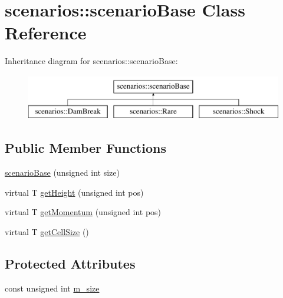 \hypertarget{classscenarios_1_1scenarioBase}{\section{scenarios\-:\-:scenario\-Base Class Reference}
\label{classscenarios_1_1scenarioBase}
}
Inheritance diagram for scenarios\-:\-:scenario\-Base\-:\begin{figure}[H]
\begin{center}
\leavevmode
\includegraphics[height=2.000000cm]{classscenarios_1_1scenarioBase}
\end{center}
\end{figure}
\subsection*{Public Member Functions}
\begin{DoxyCompactItemize}
\item 
\hyperlink{classscenarios_1_1scenarioBase_adb8ed429de97c9d478460906e9d66801}{scenario\-Base} (unsigned int size)
\item 
virtual T \hyperlink{classscenarios_1_1scenarioBase_abf012aedec3ba04bbb5f84142ba568ca}{get\-Height} (unsigned int pos)
\item 
virtual T \hyperlink{classscenarios_1_1scenarioBase_a21147d04c54908772ea2d060de49327f}{get\-Momentum} (unsigned int pos)
\item 
virtual T \hyperlink{classscenarios_1_1scenarioBase_a76f3d6f7004dda1344e62bb095d7daca}{get\-Cell\-Size} ()
\end{DoxyCompactItemize}
\subsection*{Protected Attributes}
\begin{DoxyCompactItemize}
\item 
const unsigned int \hyperlink{classscenarios_1_1scenarioBase_a67c277c3749ab83d0cb1749200a38791}{m\-\_\-size}
\end{DoxyCompactItemize}


